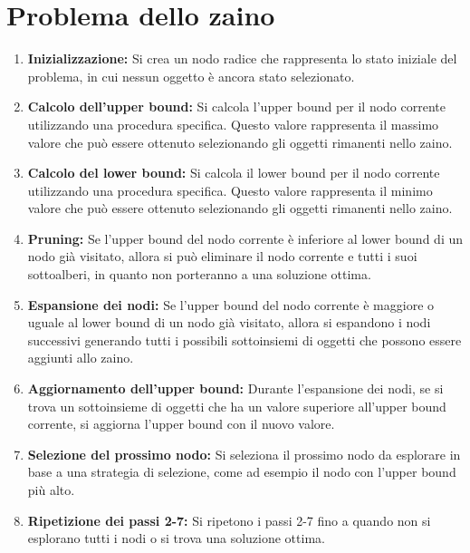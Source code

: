 \chapter{Problema dello zaino}

\begin{enumerate}
\item \textbf{Inizializzazione:} Si crea un nodo radice che rappresenta lo stato iniziale del problema, in cui nessun oggetto è ancora stato selezionato.

\item \textbf{Calcolo dell'upper bound:} Si calcola l'upper bound per il nodo corrente utilizzando una procedura specifica. Questo valore rappresenta il massimo valore che può essere ottenuto selezionando gli oggetti rimanenti nello zaino.

\item \textbf{Calcolo del lower bound:} Si calcola il lower bound per il nodo corrente utilizzando una procedura specifica. Questo valore rappresenta il minimo valore che può essere ottenuto selezionando gli oggetti rimanenti nello zaino.

\item \textbf{Pruning:} Se l'upper bound del nodo corrente è inferiore al lower bound di un nodo già visitato, allora si può eliminare il nodo corrente e tutti i suoi sottoalberi, in quanto non porteranno a una soluzione ottima.

\item \textbf{Espansione dei nodi:} Se l'upper bound del nodo corrente è maggiore o uguale al lower bound di un nodo già visitato, allora si espandono i nodi successivi generando tutti i possibili sottoinsiemi di oggetti che possono essere aggiunti allo zaino.

\item \textbf{Aggiornamento dell'upper bound:} Durante l'espansione dei nodi, se si trova un sottoinsieme di oggetti che ha un valore superiore all'upper bound corrente, si aggiorna l'upper bound con il nuovo valore.

\item \textbf{Selezione del prossimo nodo:} Si seleziona il prossimo nodo da esplorare in base a una strategia di selezione, come ad esempio il nodo con l'upper bound più alto.

\item \textbf{Ripetizione dei passi 2-7:} Si ripetono i passi 2-7 fino a quando non si esplorano tutti i nodi o si trova una soluzione ottima.
\end{enumerate}


